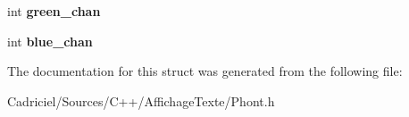 \begin{DoxyCompactItemize}
\item 
\hypertarget{struct_phont_1_1phont__bfg__common_a36f411219f776bd62814151fe6746f95}{int {\bfseries green\-\_\-chan}}\label{struct_phont_1_1phont__bfg__common_a36f411219f776bd62814151fe6746f95}

\item 
\hypertarget{struct_phont_1_1phont__bfg__common_abcb52f11fc48018f5d99109603649e68}{int {\bfseries blue\-\_\-chan}}\label{struct_phont_1_1phont__bfg__common_abcb52f11fc48018f5d99109603649e68}

\end{DoxyCompactItemize}


The documentation for this struct was generated from the following file\-:\begin{DoxyCompactItemize}
\item 
Cadriciel/\-Sources/\-C++/\-Affichage\-Texte/Phont.\-h\end{DoxyCompactItemize}
